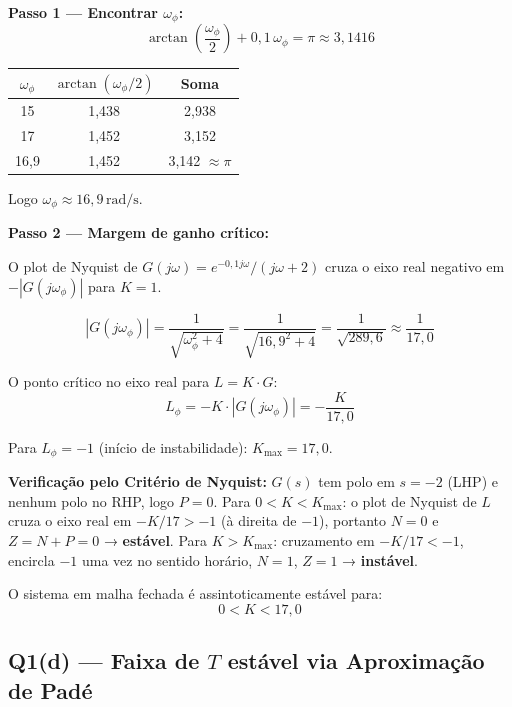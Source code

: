 \documentclass[12pt,a4paper]{article}
\begin{document}
\textbf{Passo 1 — Encontrar $\omega_\phi$:}
\[
  \arctan\!\!\left(\frac{\omega_\phi}{2}\right) + 0{,}1\,\omega_\phi = \pi \approx 3{,}1416
\]

\begin{center}
\begin{tabular}{ccc}
\toprule
$\omega_\phi$ & $\arctan(\omega_\phi/2)$ & Soma \\
\midrule
15 & 1{,}438 & 2{,}938 \\
17 & 1{,}452 & 3{,}152 \\
16{,}9 & 1{,}452 & 3{,}142 $\approx \pi$ \\
\bottomrule
\end{tabular}
\end{center}

Logo $\omega_\phi \approx 16{,}9\,\text{rad/s}$.

\textbf{Passo 2 — Margem de ganho crítico:}

O plot de Nyquist de $G(j\omega) = e^{-0{,}1j\omega}/(j\omega + 2)$ cruza o
eixo real negativo em $-|G(j\omega_\phi)|$ para $K=1$.

\[
  |G(j\omega_\phi)| = \frac{1}{\sqrt{\omega_\phi^2 + 4}}
  = \frac{1}{\sqrt{16{,}9^2 + 4}}
  = \frac{1}{\sqrt{289{,}6}}
  \approx \frac{1}{17{,}0}
\]

O ponto crítico no eixo real para $L = K \cdot G$:
\[
  L_\phi = -K \cdot |G(j\omega_\phi)| = -\frac{K}{17{,}0}
\]

Para $L_\phi = -1$ (início de instabilidade): $K_{\max} = 17{,}0$.

\textbf{Verificação pelo Critério de Nyquist:}
$G(s)$ tem polo em $s=-2$ (LHP) e nenhum polo no RHP, logo $P = 0$.
Para $0 < K < K_{\max}$: o plot de Nyquist de $L$ cruza o eixo real em
$-K/17 > -1$ (à direita de $-1$), portanto $N = 0$ e $Z = N + P = 0$ → \textbf{estável}.
Para $K > K_{\max}$: cruzamento em $-K/17 < -1$, encircla $-1$ uma vez no
sentido horário, $N = 1$, $Z = 1$ → \textbf{instável}.

\begin{resposta}
O sistema em malha fechada é assintoticamente estável para:
\[
  \boxed{0 < K < 17{,}0}
\]
\end{resposta}

\subsection*{Q1(d) — Faixa de $T$ estável via Aproximação de Padé}
\end{document}
